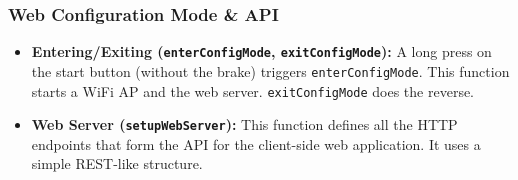 \documentclass{article}
\begin{document}
\subsubsection{Web Configuration Mode \& API}
\begin{itemize}
    \item \textbf{Entering/Exiting (\texttt{enterConfigMode}, \texttt{exitConfigMode}):} A long press on the start button (without the brake) triggers \texttt{enterConfigMode}. This function starts a WiFi AP and the web server. \texttt{exitConfigMode} does the reverse.
    \item \textbf{Web Server (\texttt{setupWebServer}):} This function defines all the HTTP endpoints that form the API for the client-side web application. It uses a simple REST-like structure.
\end{itemize}
\end{document}
